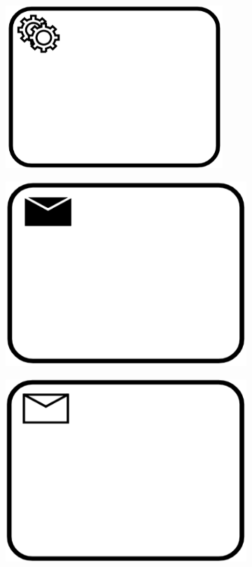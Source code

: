 \begin{figure}[h]
	\centering
	\begin{subfigure}[b]{0.18\columnwidth}
		\centering
		\includegraphics[width=0.9\textwidth]{graphics/service-task}
		\label{fig:servicetask}
	\end{subfigure}
	\begin{subfigure}[b]{0.18\columnwidth}
		\centering
		\includegraphics[width=0.9\columnwidth]{graphics/send-task}
		\label{fig:sendtask}
	\end{subfigure}
	\begin{subfigure}[b]{0.18\columnwidth}
		\centering
		\includegraphics[width=0.9\columnwidth]{graphics/receive-task}

\end{subfigure}
\end{figure}
